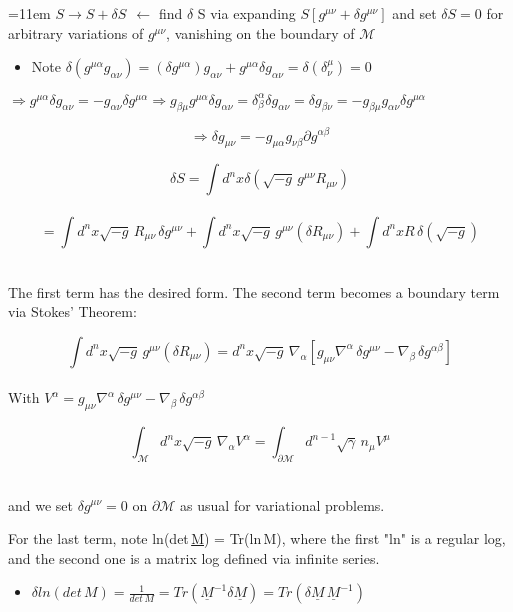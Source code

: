 \documentclass[10pt]{article}
\begin{document}
	\hangindent=11em
	$S \rightarrow S + \delta S \ \ \longleftarrow$ find $\delta$ S via expanding $S[g^{\mu \nu} + \delta g^{\mu \nu}]$ and set
	$\delta S = 0$ for arbitrary variations of $g^{\mu \nu}$, vanishing on the boundary of $\mathcal{M}$
	\begin{itemize}[label=*]
	\item Note $\delta (g^{\mu \alpha} g_{\alpha \nu}) = (\delta g^{\mu \alpha})g_{\alpha \nu} + 
	g^{\mu \alpha}\delta g_{\alpha \nu} = \delta(\delta^{\mu}_\nu) = 0$
	\end{itemize}
	$\Rightarrow g^{\mu \alpha}\delta g_{\alpha \nu} = -g_{\alpha \nu}\delta g^{\mu \alpha} \Rightarrow
	g_{\beta \mu}g^{\mu \alpha}\delta g_{\alpha \nu} = \delta_{\beta}^{\alpha}\delta g_{\alpha \nu} =
	\delta g_{\beta \nu} = -g_{\beta \mu}g_{\alpha \nu}\delta g^{\mu \alpha}$\\ \par

	$$\Rightarrow \boxed{\delta g_{\mu \nu} = -g_{\mu \alpha} g_{\nu \beta}\partial g^{\alpha \beta}}$$

	$$\delta S = \int d^{n}x \delta(\sqrt{-g}\,g^{\mu \nu}R_{\mu \nu})$$ \\
	$$= \int d^{n}x\sqrt{-g}\,R_{\mu \nu}\,\delta g^{\mu \nu} + \int d^{n}x\sqrt{-g}\,g^{\mu \nu}(\delta R_{\mu \nu})
	+ \int d^{n}x R \,\delta(\sqrt{-g})$$ \\ \par
	The first term has the desired form. The second term becomes a boundary term via Stokes' Theorem:\\ \par

	$$\int d^{n}x\sqrt{-g}\,g^{\mu \nu}(\delta R_{\mu \nu}) = d^{n}x\sqrt{-g}\,\nabla_{\alpha}[g_{\mu \nu}\nabla^{\alpha}\,
	\delta g^{\mu \nu} - \nabla_{\beta}\,\delta g^{\alpha \beta}]$$\\
	With $V^{\alpha} = g_{\mu \nu}\nabla^{\alpha}\,\delta g^{\mu \nu} - \nabla_{\beta}\,\delta g^{\alpha \beta}$ \par

	$$\int_{\mathcal{M}}d^{n}x\sqrt{-g}\,\nabla_\alpha V^{\alpha} = \int_{\partial\mathcal{M}}d^{n-1}
	\sqrt{\gamma}\,n_{\mu}V^{\mu}$$
	\\ \par
	and we set $\delta g^{\mu \nu} = 0$ on $\partial \mathcal{M}$ as usual for variational problems.\\ \par

	For the last term, note ln(det\,\underline{M}) = Tr(ln\,M), where the first "ln" is a regular log, and the second one is
	a matrix log defined via infinite series. \\ \par
	\begin{itemize}[label=*]
	\item $\delta ln(det\,M) = \frac{1}{det\,M} = Tr(\underline{M}^{-1}\delta\underline{M}) = Tr(\delta\underline{M}\,
	\underline{M}^{-1})$
	\end{itemize}
\end{document}

